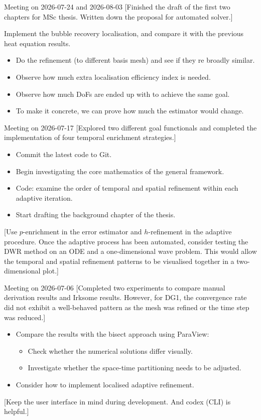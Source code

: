 \documentclass[11pt,a4paper]{article}
\begin{document}
\meet
{Meeting on 2026-07-24 and 2026-08-03}
[Finished the draft of the first two chapters for MSc thesis. Written down the proposal for automated solver.]
{Implement the bubble recovery localisation, and compare it with the previous heat equation results.
\begin{itemize}
\item Do the refinement (to different basis mesh) and see if they re broadly similar.
\item Observe how much extra localisation efficiency index is needed.
\item Observe how much DoFs are ended up with to achieve the same goal.
\item To make it concrete, we can prove how much the estimator would change.
\end{itemize}}
\vspace{1.5em}



\meet
{Meeting on 2026-07-17}
[Explored two different goal functionals and completed the implementation of four temporal enrichment strategies.]
{\begin{itemize}
\item Commit the latest code to Git.
\item Begin investigating the core mathematics of the general framework.
\item Code: examine the order of temporal and spatial refinement within each adaptive iteration.
\item Start drafting the background chapter of the thesis.
\end{itemize}}
[Use $p$-enrichment in the error estimator and $h$-refinement in the adaptive procedure. Once the adaptive process has been automated, consider testing the DWR method on an ODE and a one-dimensional wave problem. This would allow the temporal and spatial refinement patterns to be visualised together in a two-dimensional plot.]
\vspace{1.5em}



\meet
{Meeting on 2026-07-06}
[Completed two experiments to compare manual derivation results and Irksome results. However, for DG1, the convergence rate did not exhibit a well-behaved pattern as the mesh was refined or the time step was reduced.]
{\begin{itemize}
    \item Compare the results with the bisect approach using ParaView:
    \begin{itemize}
        \item Check whether the numerical solutions differ visually.
        \item Investigate whether the space-time partitioning needs to be adjusted.
    \end{itemize}
    \item Consider how to implement localised adaptive refinement.
\end{itemize}}
[Keep the user interface in mind during development. And codex (CLI) is helpful.]
\vspace{1.5em}
\end{document}

